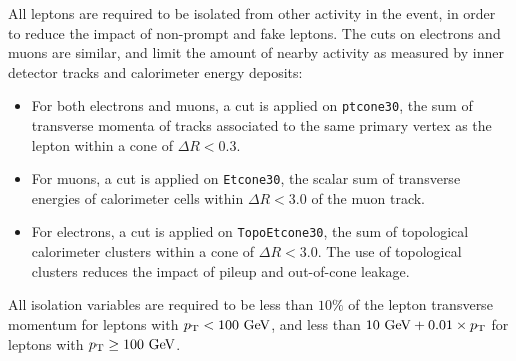 All leptons are required to be isolated from other activity in the event, in order to reduce the impact of non-prompt and fake leptons. The cuts on electrons and muons are similar, and limit the amount of nearby activity as measured by inner detector tracks and calorimeter energy deposits:
\begin{itemize}
	\item For both electrons and muons, a cut is applied on \verb.ptcone30., the sum of transverse momenta of tracks associated to the same primary vertex as the lepton within a cone of $\Delta R<0.3$. 
	\item For muons, a cut is applied on \verb.Etcone30., the scalar sum of transverse energies of calorimeter cells within $\Delta R<3.0$ of the muon track. 
	\item For electrons, a cut is applied on \verb.TopoEtcone30., the sum of topological calorimeter clusters within a cone of $\Delta R < 3.0$. The use of topological clusters reduces the impact of pileup and out-of-cone leakage. 
\end{itemize}

All isolation variables are required to be less than $10\%$ of the lepton transverse momentum for leptons with $p_{\text{T}}<100~\mbox{GeV}$, and less than $10~\mbox{GeV}+0.01\times p_{\text{T}}$ for leptons with $p_{\text{T}}\geq 100~\mbox{GeV}$. 

